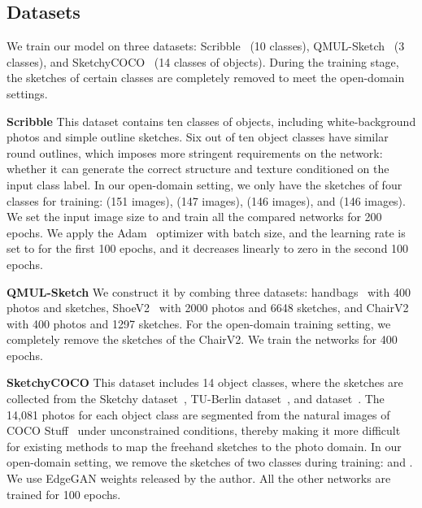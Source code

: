 \documentclass[10pt,twocolumn,letterpaper]{article}
\begin{document}
\subsection{Datasets}
\label{sec:data}
We train our model on three datasets: Scribble~\cite{ghosh2019interactive} (10 classes), QMUL-Sketch~\cite{yu2016sketch,song2017deep,liu2019unpaired} (3 classes), and SketchyCOCO~\cite{gao2020sketchycoco} (14 classes of objects). During the training stage, the sketches of certain classes are completely removed to meet the open-domain settings.

\noindent \textbf{Scribble} This dataset contains ten classes of objects, including white-background photos and simple outline sketches. Six out of ten object classes have similar round outlines, which imposes more stringent requirements on the network: whether it can generate the correct structure and texture conditioned on the input class label. In our open-domain setting, we only have the sketches of four classes for training:  (151 images),  (147 images),  (146 images), and  (146 images). We set the input image size to  and train all the compared networks for 200 epochs. We apply the Adam~\cite{kingma2014adam} optimizer with batch size, and the learning rate is set to  for the first 100 epochs, and it decreases linearly to zero in the second 100 epochs. 

\noindent \textbf{QMUL-Sketch} We construct it by combing three datasets: handbags~\cite{song2017deep} with 400 photos and sketches, ShoeV2~\cite{yu2016sketch} with 2000 photos and 6648 sketches, and ChairV2~\cite{liu2019unpaired} with 400 photos and 1297 sketches. For the open-domain training setting, we completely remove the sketches of the ChairV2. We train the networks for 400 epochs.

\noindent \textbf{SketchyCOCO} This dataset includes 14 object classes, where the sketches are collected from the Sketchy dataset~\cite{sangkloy2016sketchy}, TU-Berlin dataset~\cite{eitz2012humans}, and 
dataset~\cite{ha2017neural}. The 14,081 photos for each object class are segmented from the natural images of COCO Stuff~\cite{caesar2018coco} under unconstrained conditions, thereby making it more difficult for existing methods to map the freehand sketches to the photo domain. In our open-domain setting, we remove the sketches of two classes during training:  and . We use EdgeGAN weights released by the author. All the other networks are trained for 100 epochs.
\end{document}
